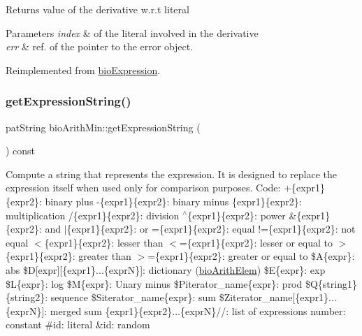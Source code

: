 \begin{DoxyReturn}{Returns}
value of the derivative w.\+r.\+t literal 
\end{DoxyReturn}

\begin{DoxyParams}{Parameters}
{\em index} & of the literal involved in the derivative \\
\hline
{\em err} & ref. of the pointer to the error object. \\
\hline
\end{DoxyParams}


Reimplemented from \hyperlink{classbio_expression_a5915579d1193f25f216c1e273c97f2ce}{bio\+Expression}.

\mbox{\label{classbio_arith_min_a22f4182d45d18801a763fb1d3d4579a3}} 
\subsubsection{\texorpdfstring{get\+Expression\+String()}{getExpressionString()}}
{\footnotesize\ttfamily pat\+String bio\+Arith\+Min\+::get\+Expression\+String (\begin{DoxyParamCaption}{ }\end{DoxyParamCaption}) const\hspace{0.3cm}{\ttfamily [virtual]}}

Compute a string that represents the expression. It is designed to replace the expression itself when used only for comparison purposes. Code\+: +\{expr1\}\{expr2\}\+: binary plus -\/\{expr1\}\{expr2\}\+: binary minus \{expr1\}\{expr2\}\+: multiplication /\{expr1\}\{expr2\}\+: division $^\wedge$\{expr1\}\{expr2\}\+: power \&\{expr1\}\{expr2\}\+: and $\vert$\{expr1\}\{expr2\}\+: or =\{expr1\}\{expr2\}\+: equal !=\{expr1\}\{expr2\}\+: not equal $<$\{expr1\}\{expr2\}\+: lesser than $<$=\{expr1\}\{expr2\}\+: lesser or equal to $>$\{expr1\}\{expr2\}\+: greater than $>$=\{expr1\}\{expr2\}\+: greater or equal to \$A\{expr\}\+: abs \$D\mbox{[}expr\mbox{]}\mbox{[}\{expr1\}...\{exprN\}\mbox{]}\+: dictionary (\hyperlink{classbio_arith_elem}{bio\+Arith\+Elem}) \$E\{expr\}\+: exp \$L\{expr\}\+: log \$M\{expr\}\+: Unary minus \$\+Piterator\+\_\+name\{expr\}\+: prod \$Q\{string1\}\{string2\}\+: sequence \$\+Siterator\+\_\+name\{expr\}\+: sum \$\+Ziterator\+\_\+name\mbox{[}\{expr1\}...\{exprN\}\mbox{]}\+: merged sum \{expr1\}\{expr2\}...\{exprN\}//\+: list of expressions number\+: constant \#id\+: literal \&id\+: random 


